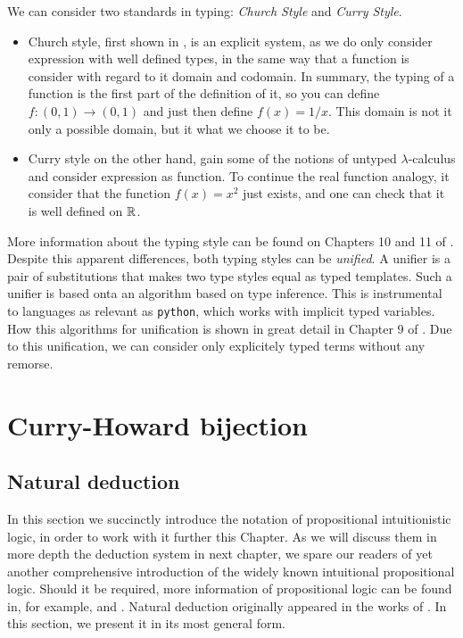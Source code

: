 We can consider two standards in typing: \emph{Church Style} and \emph{Curry Style}.
\begin{itemize}
\item Church style,  first shown in \cite{church1940formulation}, is an explicit system, as we do only consider expression with well defined types, in the same way that a function is consider with regard to it domain and codomain. In summary, the typing of a function is the first part of the definition of it, so you can define $f:(0,1)\to (0,1)$ and just then define $f(x)=1/x$. This domain is not it only a possible domain, but it what we choose it to be. 
\item Curry style on the other hand, gain some of the notions of untyped $\lambda$-calculus and consider expression as function. To continue the real function analogy, it consider that the function $f(x)=x^2$ just exists, and one can check that it is well defined on $\mathbb{R}$. \\
\end{itemize}
More information about the typing style can be found on Chapters 10 and 11 of \cite{hindley2008lambda}. \\

Despite this apparent differences, both typing styles can be \emph{unified}. A unifier is a pair of substitutions that makes two type styles equal as typed templates. Such a unifier is based onta an algorithm based on type inference. This is instrumental to languages  as relevant as \texttt{python}, which works with implicit typed variables. How this algorithms for unification is shown in great detail in Chapter 9  of \cite{selinger2008lecture}. Due to this unification, we can consider only explicitely typed terms without any remorse.

\section{Curry-Howard bijection}
\subsection{Natural deduction}
In this section we succinctly introduce the notation of propositional intuitionistic logic, in order to work with it further this Chapter. As we will discuss them in more depth the deduction system in next chapter, we spare our readers of yet another comprehensive introduction of the widely known intuitional propositional logic. Should it be required, more information of propositional logic can be found in, for example, \cite{marek2009introduction} and \cite{wadler2015propositions}. Natural deduction originally appeared in the works of \cite{gentzen1935untersuchungen}. In this section, we present it in its most general form. \\

